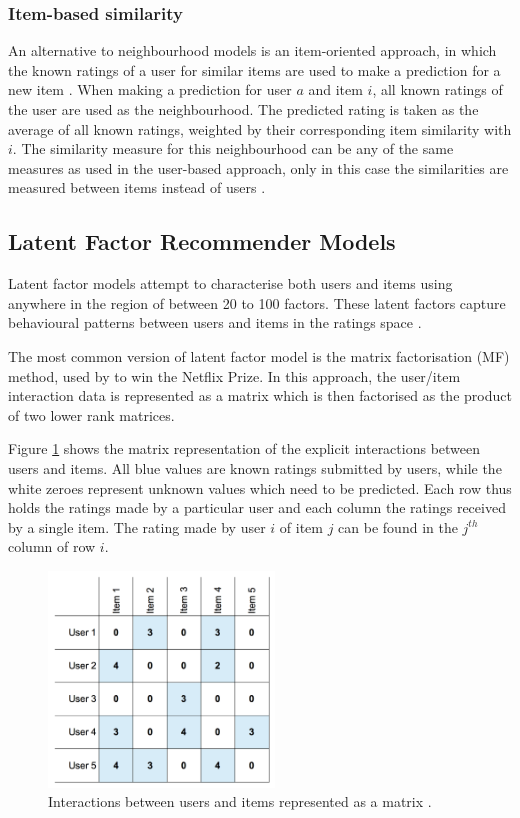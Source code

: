\subsubsection{Item-based similarity}
An alternative to neighbourhood models is an item-oriented approach, in which the known ratings of a user for similar items are used to make a prediction for a new item \parencite{cf_1.6_implicit}. When making a prediction for user $a$ and item $i$, all known ratings of the user are used as the neighbourhood. The predicted rating is taken as the average of all known ratings, weighted by their corresponding item similarity with $i$. The similarity measure for this neighbourhood can be any of the same measures as used in the user-based approach, only in this case the similarities are measured between items instead of users \parencite{handbook_1.4_neighbourhood}.

\subsection{Latent Factor Recommender Models}
Latent factor models attempt to characterise both users and items using anywhere in the region of between 20 to 100 factors. These latent factors capture behavioural patterns between users and items in the ratings space \parencite{koren2009matrix}.

The most common version of latent factor model is the matrix factorisation (MF) method, used by \cite{bellkor_2008} to win the Netflix Prize. In this approach, the user/item interaction data is represented as a matrix which is then factorised as the product of two lower rank matrices. 

Figure \ref{fig:2_matrix-decomposition} shows the matrix representation of the explicit interactions between users and items. All blue values are known ratings submitted by users, while the white zeroes represent unknown values which need to be predicted. Each row thus holds the ratings made by a particular user and each column the ratings received by a single item. The rating made by user $i$ of item $j$ can be found in the $j^{th}$ column of row $i$.

\begin{figure}[H]
\centering
\includegraphics[width=6cm]{Figures/2_3_matrix.png}
\decoRule
\caption[Ratings matrix]{Interactions between users and items represented as a matrix \parencite{bailey_2016}.}
\label{fig:2_matrix-decomposition}
\end{figure}

